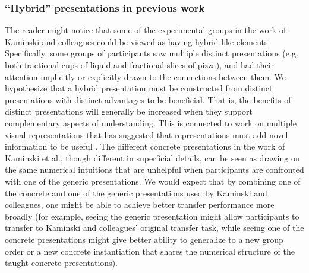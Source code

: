 \documentclass[man,10pt]{apa6}
\begin{document}
\subsubsection{``Hybrid'' presentations in previous work}
The reader might notice that some of the experimental groups in the work of Kaminski and colleagues could be viewed as having hybrid-like elements. Specifically, some groups of participants saw multiple distinct presentations (e.g. both fractional cups of liquid and fractional slices of pizza), and had their attention implicitly or explicitly drawn to the connections between them. We hypothesize that a hybrid presentation must be constructed from distinct presentations with distinct advantages to be beneficial. That is, the benefits of distinct presentations will generally be increased when they support complementary aspects of understanding. This is connected to work on multiple visual representations that has suggested that representations must add novel information to be useful . The different concrete presentations in the work of Kaminski et al., though different in superficial details, can be seen as drawing on the same numerical intuitions that are unhelpful when participants are confronted with one of the generic presentations. We would expect that by combining one of the concrete and one of the generic presentations used by Kaminski and colleagues, one might be able to achieve better transfer performance more broadly (for example, seeing the generic presentation might allow participants to transfer to Kaminski and colleagues' original transfer task, while seeing one of the concrete presentations might give better ability to generalize to a new group order or a new concrete instantiation that shares the numerical structure of the taught concrete presentations).  
\end{document}
